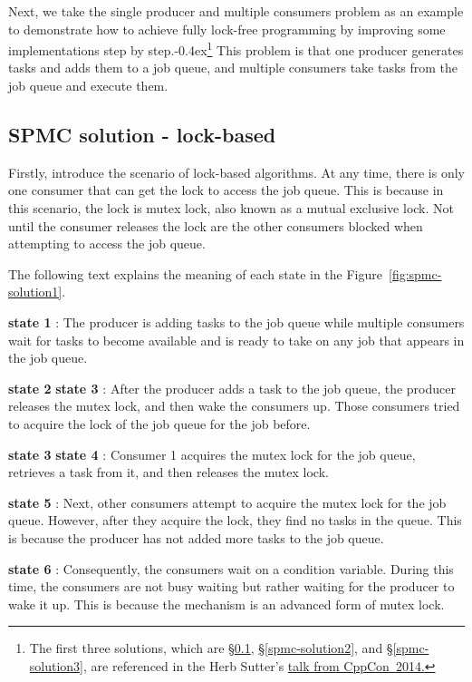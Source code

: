 \documentclass[fontsize=10pt, oneside]{scrartcl}
\newcommand{\punckern}{\kern-0.4ex}
\newcommand{\fig}[1]{Figure~\ref{#1}}
\newcommand{\secref}[1]{\hyperref[#1]{\textsc{\S}\ref*{#1}}}
\begin{document}
Next, we take the single producer and multiple consumers problem as an example to demonstrate how to achieve fully lock-free programming by improving some implementations step by step.\punckern\footnote{%
The first three solutions, which are \secref{spmc-solution1}, \secref{spmc-solution2}, and \secref{spmc-solution3}, are referenced in the Herb Sutter's
\href{https://youtu.be/c1gO9aB9nbs?si=7qJs-0qZAVqLHr1P}{talk from CppCon~2014.}}
This problem is that one producer generates tasks and adds them to a job queue, 
and multiple consumers take tasks from the job queue and execute them.
\subsection{SPMC solution - lock-based}
\label{spmc-solution1}
Firstly, introduce the scenario of lock-based algorithms. 
At any time, there is only one consumer that can get the lock to access the job queue.
This is because in this scenario, the lock is mutex lock, also known as a mutual exclusive lock.
Not until the consumer releases the lock are the other consumers blocked when attempting to access the job queue.

The following text explains the meaning of each state in the \fig{fig:spmc-solution1}.

\textbf{state 1} : The producer is adding tasks to the job queue while multiple consumers wait for tasks to become available and is ready to take on any job that appears in the job queue.

\textbf{state 2} \to \textbf{state 3} : After the producer adds a task to the job queue, 
the producer releases the mutex lock, and then wake the consumers up. 
Those consumers tried to acquire the lock of the job queue for the job before.

\textbf{state 3} \to \textbf{state 4} : Consumer 1 acquires the mutex lock for the job queue, 
retrieves a task from it, and then releases the mutex lock.

\textbf{state 5} : Next, other consumers attempt to acquire the mutex lock for the job queue.
However, after they acquire the lock, they find no tasks in the queue.
This is because the producer has not added more tasks to the job queue.

\textbf{state 6} : Consequently, the consumers wait on a condition variable. 
During this time, the consumers are not busy waiting but rather waiting for the producer to wake it up. 
This is because the mechanism is an advanced form of mutex lock.
\end{document}
